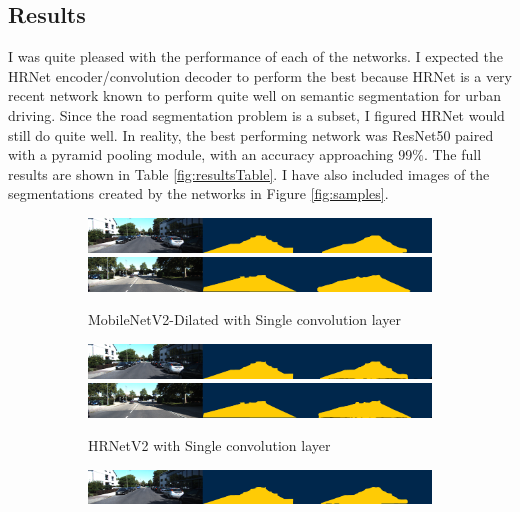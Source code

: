 \documentclass[10pt,twocolumn,letterpaper]{article}
\begin{document}
\subsection{Results}
I was quite pleased with the performance of each of the networks. I expected the HRNet encoder/convolution decoder to perform the best because HRNet is a very recent network known to perform quite well on semantic segmentation for urban driving. Since the road segmentation problem is a subset, I figured HRNet would still do quite well. In reality, the best performing network was ResNet50 paired with a pyramid pooling module, with an accuracy approaching 99\%. The full results are shown in Table \ref{fig:resultsTable}. I have also included images of the segmentations created by the networks in Figure \ref{fig:samples}.

\begin{figure}
    \centering
    \begin{subfigure}[t]{\linewidth}
        \centering
        \includegraphics[width=0.9\linewidth]{images/mn_a.png}
        \includegraphics[width=0.9\linewidth]{images/mn_b.png}
        \caption{MobileNetV2-Dilated with Single convolution layer}
    \end{subfigure}
    \begin{subfigure}[t]{\linewidth}
        \centering
        \includegraphics[width=0.9\linewidth]{images/hr_a.png}
        \includegraphics[width=0.9\linewidth]{images/hr_b.png}
        \caption{HRNetV2 with Single convolution layer}
    \end{subfigure}
    \begin{subfigure}[t]{\linewidth}
        \centering
        \includegraphics[width=0.9\linewidth]{images/rn50_a.png}

\end{subfigure}
\end{figure}
\end{document}
